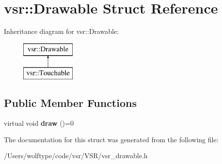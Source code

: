 \hypertarget{structvsr_1_1_drawable}{\section{vsr\-:\-:Drawable Struct Reference}
\label{structvsr_1_1_drawable}
}
Inheritance diagram for vsr\-:\-:Drawable\-:\begin{figure}[H]
\begin{center}
\leavevmode
\includegraphics[height=2.000000cm]{structvsr_1_1_drawable}
\end{center}
\end{figure}
\subsection*{Public Member Functions}
\begin{DoxyCompactItemize}
\item 
\hypertarget{structvsr_1_1_drawable_a14f50b3fb38cf5c4bfd9de30236bb8ca}{virtual void {\bfseries draw} ()=0}\label{structvsr_1_1_drawable_a14f50b3fb38cf5c4bfd9de30236bb8ca}

\end{DoxyCompactItemize}


The documentation for this struct was generated from the following file\-:\begin{DoxyCompactItemize}
\item 
/\-Users/wolftype/code/vsr/\-V\-S\-R/vsr\-\_\-drawable.\-h\end{DoxyCompactItemize}
